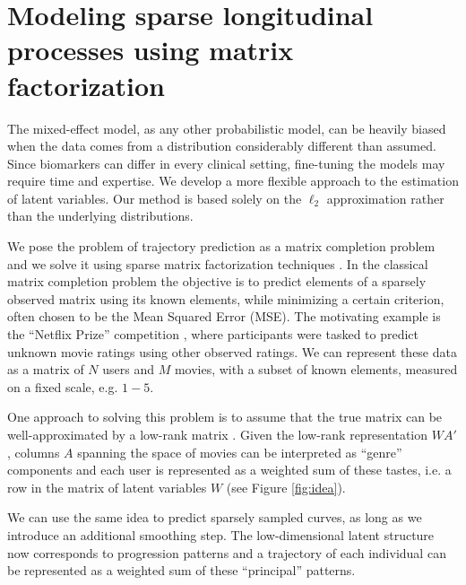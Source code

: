\documentclass[preprint]{imsart}
\numberwithin{equation}{section}
\theoremstyle{plain}
\begin{document}

\section{Modeling sparse longitudinal processes using matrix factorization}\label{s:context}


The mixed-effect model, as any other probabilistic model, can be heavily biased when the data comes from a distribution considerably different than assumed. Since biomarkers can differ in every clinical setting, fine-tuning the models may require time and expertise. We develop a more flexible approach to the estimation of latent variables. Our method is based solely on the $\ell_2$ approximation rather than the underlying distributions.

We pose the problem of trajectory prediction as a matrix completion problem and we solve it using sparse matrix factorization techniques \citep{rennie2005fast, candes2009exact}. In the classical matrix completion problem the objective is to predict elements of a sparsely observed matrix using its known elements, while minimizing a certain criterion, often chosen to be the Mean Squared Error (MSE). The motivating example is the ``Netflix Prize'' competition \citep{bennett2007netflix}, where participants were tasked to predict unknown movie ratings using other observed ratings. We can represent these data as a matrix of $N$ users and $M$ movies, with a subset of known elements, measured on a fixed scale, e.g. $1-5$.

One approach to solving this problem is to assume that the true matrix can be well-approximated by a low-rank matrix \citep{srebro2005generalization}. Given the low-rank representation $WA'$, columns $A$ spanning the space of movies can be interpreted as ``genre'' components and each user is represented as a weighted sum of these tastes, i.e. a row in the matrix of latent variables $W$ (see Figure \ref{fig:idea}).

We can use the same idea to predict sparsely sampled curves, as long as we introduce an additional smoothing step. The low-dimensional latent structure now corresponds to progression patterns and a trajectory of each individual can be represented as a weighted sum of these ``principal'' patterns.
\end{document}
